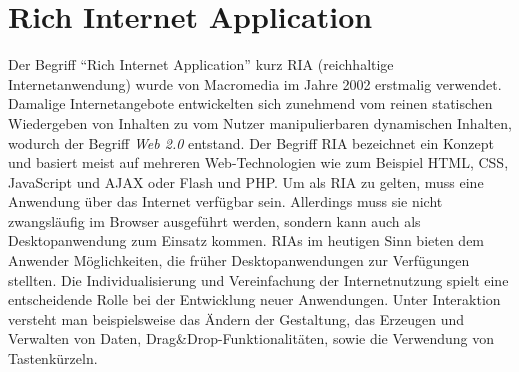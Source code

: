 \section{Rich Internet Application}
Der Begriff ``Rich Internet Application'' kurz RIA (reichhaltige
Internetanwendung) wurde von Macromedia im Jahre 2002 erstmalig verwendet.
Damalige Internetangebote entwickelten sich zunehmend vom reinen statischen
Wiedergeben von Inhalten zu vom Nutzer manipulierbaren dynamischen Inhalten,
wodurch der Begriff \emph{Web 2.0} entstand. Der Begriff RIA
bezeichnet ein Konzept und basiert meist auf mehreren Web-Technologien
wie zum Beispiel HTML, CSS, JavaScript und AJAX oder Flash und PHP. Um als RIA
zu gelten, muss eine Anwendung über das Internet verfügbar sein. Allerdings
muss sie nicht zwangsläufig im Browser ausgeführt werden, sondern kann
auch als Desktopanwendung zum Einsatz kommen. RIAs im heutigen Sinn bieten dem
Anwender Möglichkeiten, die früher Desktopanwendungen zur Verfügungen stellten.
Die Individualisierung und Vereinfachung der Internetnutzung spielt eine
entscheidende Rolle bei der Entwicklung neuer Anwendungen. Unter Interaktion
versteht man beispielsweise das Ändern der Gestaltung, das Erzeugen und
Verwalten von Daten, Drag\&Drop-Funktionalitäten, sowie die Verwendung von
Tastenkürzeln.